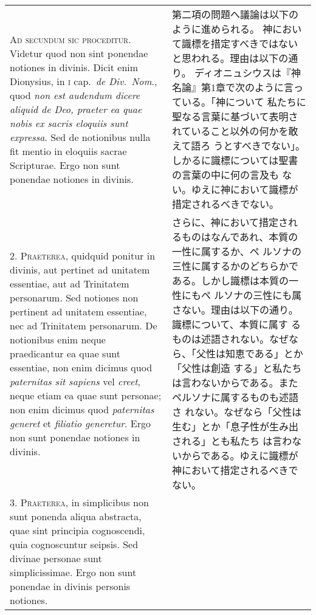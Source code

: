 \documentclass[10pt]{jsarticle} %
\begin{document}
\begin{longtable}{p{21em}p{21em}}

{\scshape Ad secundum sic proceditur}. Videtur quod non sint ponendae notiones in
divinis. Dicit enim Dionysius, in {\scshape i} cap.~{\itshape de Div.~Nom}., quod {\itshape non est
audendum dicere aliquid de Deo, praeter ea quae nobis ex sacris
eloquiis sunt expressa}. Sed de notionibus nulla fit mentio in eloquiis
sacrae Scripturae. Ergo non sunt ponendae notiones in divinis.


&

第二項の問題へ議論は以下のように進められる。
神において識標を措定すべきではないと思われる。理由は以下の通り。
ディオニュシウスは『神名論』第1章で次のように言っている。「神について
 私たちに聖なる言葉に基づいて表明されていること以外の何かを敢えて語ろ
 うとすべきでない」。しかるに識標については聖書の言葉の中に何の言及も
 ない。ゆえに神において識標が措定されるべきでない。




\\



2. {\scshape Praeterea}, quidquid ponitur in divinis, aut pertinet ad unitatem
essentiae, aut ad Trinitatem personarum. Sed notiones non pertinent ad
unitatem essentiae, nec ad Trinitatem personarum. De notionibus enim
neque praedicantur ea quae sunt essentiae, non enim dicimus quod
{\itshape paternitas sit sapiens} vel {\itshape creet}, neque etiam ea quae sunt personae;
non enim dicimus quod {\itshape paternitas generet} et {\itshape filiatio generetur}. Ergo
non sunt ponendae notiones in divinis.


&

さらに、神において措定されるものはなんであれ、本質の一性に属するか、ペ
 ルソナの三性に属するかのどちらかである。しかし識標は本質の一性にもペ
 ルソナの三性にも属さない。理由は以下の通り。識標について、本質に属す
 るものは述語されない。なぜなら、「父性は知恵である」とか「父性は創造
 する」と私たちは言わないからである。またペルソナに属するものも述語さ
 れない。なぜなら「父性は生む」とか「息子性が生み出される」とも私たち
 は言わないからである。ゆえに識標が神において措定されるべきでない。


\\



3. {\scshape Praeterea}, in simplicibus non sunt ponenda aliqua abstracta, quae sint
principia cognoscendi, quia cognoscuntur seipsis. Sed divinae personae
sunt simplicissimae. Ergo non sunt ponendae in divinis personis
notiones.



\end{longtable}
\end{document}
